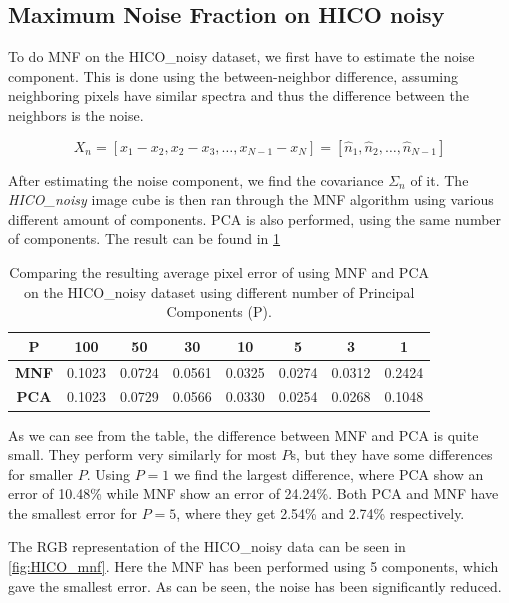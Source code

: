 \subsection{Maximum Noise Fraction on HICO noisy}

To do MNF on the HICO\_noisy dataset, we first have to estimate the noise component. This is 
done using the between-neighbor difference, assuming neighboring pixels have similar 
spectra and thus the difference between the neighbors is the noise. 

\begin{equation}
    X_n = [x_1 - x_2, x_2 - x_3, \dots, x_{N-1} - x_N] = [\hat{n}_1, \hat{n}_2, \dots, \hat{n}_{N-1}]
\end{equation}

After estimating the noise component, we find the covariance $\Sigma_n$ of it. The \textit{HICO\_noisy} 
image cube is then ran through the MNF algorithm using various different amount of components. PCA 
is also performed, using the same number of components. The result can be found in \cref{table:mnf_pca}

\begin{table}[h]
    \centering
    \begin{tabular}{c|ccccccc}
        \textbf{P}   & \textbf{100} & \textbf{50} & \textbf{30} & \textbf{10} & \textbf{5} & \textbf{3} & \textbf{1} \\ \hline
        \textbf{MNF} & 0.1023       & 0.0724      & 0.0561      & 0.0325      & 0.0274     & 0.0312     & 0.2424     \\
        \textbf{PCA} & 0.1023       & 0.0729      & 0.0566      & 0.0330      & 0.0254     & 0.0268     & 0.1048    
    \end{tabular} 
    \caption{Comparing the resulting average pixel error of using MNF and PCA on the HICO\_noisy dataset
    using different number of Principal Components (P).}
    \label{table:mnf_pca}
\end{table}

As we can see from the table, the difference between MNF and PCA is quite small. They perform very similarly 
for most $P$s, but they have some differences for smaller $P$. Using $P = 1$ we find the largest difference, 
where PCA show an error of 10.48\% while MNF show an error of 24.24\%. Both PCA and MNF have the smallest error 
for $P = 5$, where they get 2.54\% and 2.74\% respectively. 

The RGB representation of the HICO\_noisy data can be seen in \cref{fig:HICO_mnf}. Here the 
MNF has been performed using 5 components, which gave the smallest error. As can be seen, 
the noise has been significantly reduced. 

